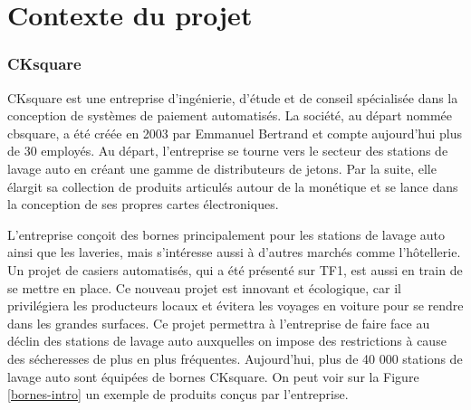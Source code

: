 \documentclass[a4paper]{article}
\begin{document}
\clearpage{}



\part{Contexte du projet}

\section{CKsquare}%

CKsquare est une entreprise d'ingénierie, d'étude et de conseil spécialisée dans
la conception de systèmes de paiement automatisés. La société, au départ nommée
cbsquare, a été créée en 2003 par Emmanuel Bertrand et compte aujourd'hui plus
de 30 employés. Au départ, l'entreprise se tourne vers le secteur des stations
de lavage auto en créant une gamme de distributeurs de jetons. Par la suite,
elle élargit sa collection de produits articulés autour de la monétique et se
lance dans la conception de ses propres cartes électroniques.

L'entreprise conçoit des bornes principalement pour les stations de lavage auto
ainsi que les laveries, mais s'intéresse aussi à d'autres marchés comme
l'hôtellerie. Un projet de casiers automatisés, qui a été présenté sur TF1, est
aussi en train de se mettre en place. Ce nouveau projet est innovant et
écologique, car il privilégiera les producteurs locaux et évitera les voyages en
voiture pour se rendre dans les grandes surfaces. Ce projet permettra à
l'entreprise de faire face au déclin des stations de lavage auto auxquelles on
impose des restrictions à cause des sécheresses de plus en plus fréquentes.
Aujourd'hui, plus de 40 000 stations de lavage auto sont équipées de bornes
CKsquare. On peut voir sur la Figure \ref{bornes-intro} un exemple de produits
conçus par l'entreprise.
\end{document}
